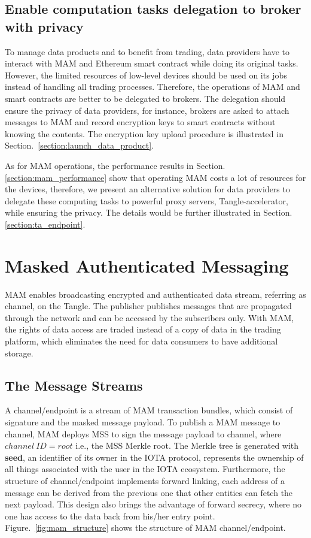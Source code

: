 \documentclass[conference]{IEEEtran}
\begin{document}
\subsection{Enable computation tasks delegation to broker with privacy}
To manage data products and to benefit from trading, data providers have to interact with MAM and Ethereum smart contract while doing its original tasks. However, the limited resources of low-level devices should be used on its jobs instead of handling all trading processes. Therefore, the operations of MAM and smart contracts are better to be delegated to brokers. The delegation should ensure the privacy of data providers, for instance, brokers are asked to attach messages to MAM and record encryption keys to smart contracts without knowing the contents. The encryption key upload procedure is illustrated in Section.~\ref{section:launch_data_product}.

As for MAM operations, the performance results in Section.\ref{section:mam_performance} show that operating MAM costs a lot of resources for the devices, therefore, we present an alternative solution for data providers to delegate these computing tasks to powerful proxy servers, Tangle-accelerator\cite{TA}, while ensuring the privacy. The details would be further illustrated in Section.\ref{section:ta_endpoint}. 

\section{Masked Authenticated Messaging}
\label{section:MAM}
MAM enables broadcasting encrypted and authenticated data stream, referring as channel, on the Tangle. The publisher publishes messages that are propagated through the network and can be accessed by the subscribers only. With MAM, the rights of data access are traded instead of a copy of data in the trading platform, which eliminates the need for data consumers to have additional storage. 

\subsection{The Message Streams}
A channel/endpoint is a stream of MAM transaction bundles, which consist of signature and the masked message payload. To publish a MAM message to channel, MAM deploys MSS to sign the message payload to channel, where $channel\ ID = root$ i.e., the MSS Merkle root. The Merkle tree is generated with \textbf{seed}, an identifier of its owner in the IOTA protocol, represents the ownership of all things associated with the user in the IOTA ecosystem. Furthermore, the structure of channel/endpoint implements forward linking, each address of a message can be derived from the previous one that other entities can fetch the next payload. This design also brings the advantage of forward secrecy, where no one has access to the data back from his/her entry point. Figure.~\ref{fig:mam_structure} shows the structure of MAM channel/endpoint. 
\end{document}
